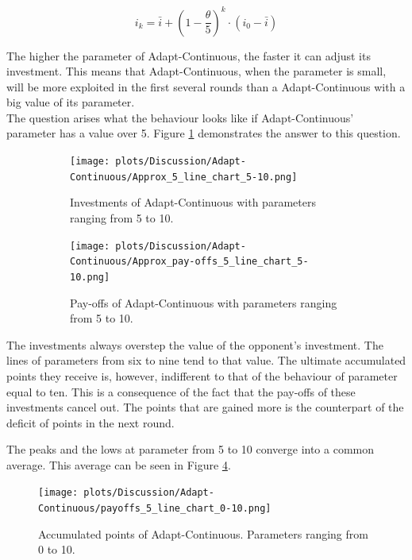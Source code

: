\documentclass{article}
\begin{document}
	\begin{equation}
		i_k = \bar i + (1 - \frac{\theta}{5})^k \cdot (i_0 - \bar i)
		\label{eq:AdpC_i_eq_expl}
	\end{equation}
	
	The higher the parameter of Adapt-Continuous, the faster it can adjust its investment.
	This means that Adapt-Continuous, when the parameter is small, will be more exploited in the first several rounds than a Adapt-Continuous with a big value of its parameter.\\
	
	The question arises what the behaviour looks like if Adapt-Continuous' parameter has a value over 5.
	Figure \ref{fig:AdpC_approx_investm_5-10} demonstrates the answer to this question.\\
	\begin{figure}[h!]
		\centering
		\begin{subfigure}[t]{0.45\textwidth}
			\centering
			\texttt{[image: plots/Discussion/Adapt-Continuous/Approx\_5\_line\_chart\_5-10.png]}
			\caption{Investments of Adapt-Continuous with parameters ranging from 5 to 10.}
			\label{fig:AdpC_approx_investm_5-10}
		\end{subfigure}
		\hfill
		\begin{subfigure}[t]{0.45\textwidth}
			\centering
			\texttt{[image: plots/Discussion/Adapt-Continuous/Approx\_pay-offs\_5\_line\_chart\_5-10.png]}
			\caption{Pay-offs of Adapt-Continuous with parameters ranging from 5 to 10.}
			\label{fig:AdpC_approx_payoff_5-10}
		\end{subfigure}
		\caption{}
		\label{fig:AdpC_approx_invetm_and_payoffs_5-10}
	\end{figure}
	
	The investments always overstep the value of the opponent's investment.
	The lines of parameters from six to nine tend to that value.
	The ultimate accumulated points they receive is, however, indifferent to that of the behaviour of parameter equal to ten.
	This is a consequence of the fact that the pay-offs of these investments cancel out.
	The points that are gained more is the counterpart of the deficit of points in the next round.
	
	The peaks and the lows at parameter from 5 to 10 converge into a common average.
	This average can be seen in Figure \ref{fig:AdpC_avr_points}.\\
	\begin{figure}[h]
		\begin{center}
			\texttt{[image: plots/Discussion/Adapt-Continuous/payoffs\_5\_line\_chart\_0-10.png]}
		\end{center}
		\caption{Accumulated points of Adapt-Continuous. Parameters ranging from 0 to 10.}
		\label{fig:AdpC_avr_points}
	\end{figure}
	
\end{document}
